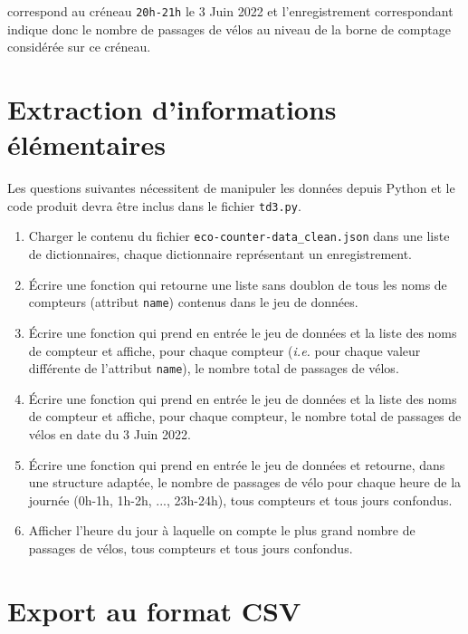 \documentclass[11pt,a4paper]{article}
\begin{document}
\noindent
correspond au créneau \verb+20h-21h+ le 3 Juin 2022 et l'enregistrement correspondant indique donc le nombre de passages de vélos au niveau de la borne de comptage considérée sur ce créneau.

\section{Extraction d'informations élémentaires}

Les questions suivantes nécessitent de manipuler les données depuis Python et le code produit devra être inclus dans le fichier \verb+td3.py+.

\begin{enumerate}
\item Charger le contenu du fichier \verb+eco-counter-data_clean.json+ dans une liste de dictionnaires, chaque dictionnaire représentant un enregistrement.

\item Écrire une fonction qui retourne une liste sans doublon de tous les noms de compteurs (attribut \verb+name+) contenus dans le jeu de données.

\item Écrire une fonction qui prend en entrée le jeu de données et la liste des noms de compteur et affiche, pour chaque compteur (\emph{i.e.} pour chaque valeur différente de l'attribut \verb+name+), le nombre total de passages de vélos.

\item Écrire une fonction qui prend en entrée le jeu de données et la liste des noms de compteur et affiche, pour chaque compteur, le nombre total de passages de vélos en date du 3 Juin 2022.

\item Écrire une fonction qui prend en entrée le jeu de données et retourne, dans une structure adaptée, le nombre de passages de vélo pour chaque heure de la journée (0h-1h, 1h-2h, ..., 23h-24h), tous compteurs et tous jours confondus.

\item Afficher l'heure du jour à laquelle on compte le plus grand nombre de passages de vélos, tous compteurs et tous jours confondus.
\end{enumerate}

\section{Export au format CSV}
\end{document}
